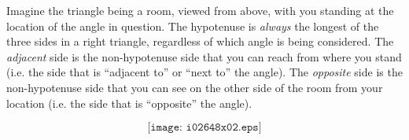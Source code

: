 \vskip 10pt

Imagine the triangle being a room, viewed from above, with you standing at the location of the angle in question.  The hypotenuse is {\it always} the longest of the three sides in a right triangle, regardless of which angle is being considered.  The {\it adjacent} side is the non-hypotenuse side that you can reach from where you stand (i.e. the side that is ``adjacent to'' or ``next to'' the angle).  The {\it opposite} side is the non-hypotenuse side that you can see on the other side of the room from your location (i.e. the side that is ``opposite'' the angle).

$$\texttt{[image: i02648x02.eps]}$$











